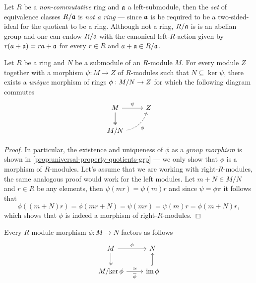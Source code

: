 \begin{example}
    \label{exp:R/ideal-is-always-module}
    Let \(R\) be a \emph{non-commutative} ring and \(\mathfrak{a}\) a left-submodule,
    then the \emph{set} of equivalence classes \(R/\mathfrak{a}\) is \emph{not a ring}
    --- since \(\mathfrak{a}\) is be required to be a two-sided-ideal for the quotient
    to be a ring. Although not a ring, \(R/\mathfrak{a}\) is is an abelian group and
    one can endow \(R/\mathfrak{a}\) with the canonical left-\(R\)-action given by
    \(r (a + \mathfrak{a}) = r a + \mathfrak{a}\) for every \(r \in R\) and
    \(a + \mathfrak{a} \in R/\mathfrak{a}\).
\end{example}

\begin{theorem}
    \label{thm:univ-prop-quotient-modules}
    Let \(R\) be a ring and \(N\) be a submodule of an \(R\)-module \(M\). For every
    module \(Z\) together with a morphism \(\psi: M \to Z\) of \(R\)-modules such
    that \(N \subseteq \ker \psi\), there exists a \emph{unique} morphism of rings
    \(\phi: M/N \to Z\) for which the following diagram commutes
    \[
        \begin{tikzcd}
            M \ar[d, two heads] \ar[r, "\psi"] & Z \\
            M/N \ar[ru, dashed, bend right, "\phi"']
        \end{tikzcd}
    \]
\end{theorem}

\begin{proof}
    In particular, the existence and uniqueness of \(\phi\) as a \emph{group
        morphism} is shown in \cref{prop:universal-property-quotients-grp} --- we only
    show that \(\phi\) is a morphism of \(R\)-modules. Let's assume that we are
    working with right-\(R\)-modules, the same analogous proof would work for the
    left modules. Let \(m + N \in M/N\) and \(r \in R\) be any elements, then
    \(\psi(m r) = \psi(m) r\) and since \(\psi = \phi \pi\) it follows that
    \[
        \phi((m + N) r) = \phi(m r + N) = \psi(m r) = \psi(m) r = \phi(m + N) r,
    \]
    which shows that \(\phi\) is indeed a morphism of right-\(R\)-modules.
\end{proof}

\begin{theorem}
    \label{thm:R-module-morphism-factorization}
    Every \(R\)-module morphism \(\phi: M \to N\) factors as follows
    \[
        \begin{tikzcd}
            M \ar[r, "\phi"] \ar[d, two heads] &N \\
            M/{\ker \phi} \ar[r, "\dis", "\overline{\phi}"'] & \im \phi \ar[u, hook]
        \end{tikzcd}
    \]
\end{theorem}

